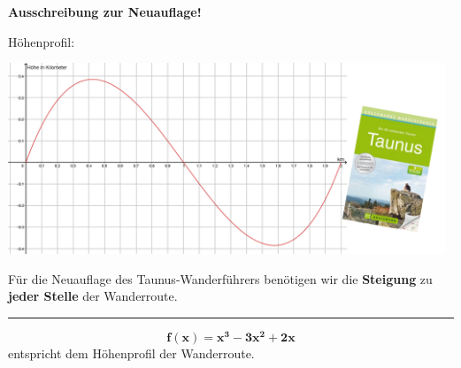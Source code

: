 \documentclass[oneside,openany,headings=optiontotoc,11pt,numbers=noenddot]{scrreprt}
\begin{document}
	\begin{landscape}
		\begin{framed}
			\Huge{\textbf{Ausschreibung zur Neuauflage!}}
			\begin{center}
				\begin{minipage}{0.25\textwidth}
					\Large{Höhenprofil:}\\
				\end{minipage}
				\hfill
				\begin{minipage}{0.7\textwidth}
					\includegraphics[width=0.98\textwidth,align=t]{../99_Bilder/190219_ExamenProb_1.png}\\
				\end{minipage}
				
				\par\bigskip\noindent
				Für die Neuauflage des Taunus-Wanderführers benötigen wir die \textbf{Steigung} zu \textbf{jeder Stelle} der Wanderroute. \\
				\rule{\textwidth}{0.1pt}
				\[\mathbf{f(x) = x^3 -3x^2 + 2x}\] entspricht dem Höhenprofil der Wanderroute.\\
			\end{center}
		\end{framed}
	\end{landscape}
\end{document}
